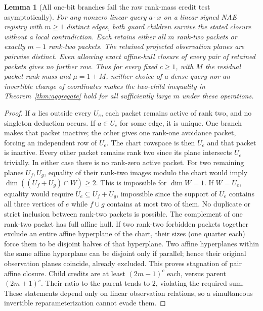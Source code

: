 \documentclass[11pt]{article}
\newtheorem{lemma}[theorem]{Lemma}
\begin{document}
\begin{lemma}[All one-bit branches fail the raw rank-mass credit test asymptotically]\label{lem:da15-one}
For any nonzero linear query $a\cdot x$ on a linear signed NAE registry with $m\ge1$ distinct edges, both guard children survive the stated closure without a local contradiction. Each retains either all $m$ rank-two packets or exactly $m-1$ rank-two packets. The retained projected observation planes are pairwise distinct. Even allowing exact affine-hull closure of every pair of retained packets gives no further row. Thus for every fixed $c\ge1$, with $M$ the residual packet rank mass and $\mu=1+M$, neither choice of a dense query nor an invertible change of coordinates makes the two-child inequality in Theorem~\ref{thm:aggregate} hold for all sufficiently large $m$ under these operations.
\end{lemma}
\begin{proof}
If $a$ lies outside every $U_e$, each packet remains active of rank two, and no singleton deduction occurs. If $a\in U_e$ for some edge, it is unique. One branch makes that packet inactive; the other gives one rank-one avoidance packet, forcing an independent row of $U_e$. The chart rowspace is then $U_e$ and that packet is inactive. Every other packet remains rank two since its plane intersects $U_e$ trivially. In either case there is no rank-zero active packet. For two remaining planes $U_f,U_g$, equality of their rank-two images modulo the chart would imply $\dim((U_f+U_g)\cap W)\ge2$. This is impossible for $\dim W=1$. If $W=U_e$, equality would require $U_e\subseteq U_f+U_g$, impossible since the support of $U_e$ contains all three vertices of $e$ while $f\cup g$ contains at most two of them. No duplicate or strict inclusion between rank-two packets is possible. The complement of one rank-two packet has full affine hull. If two rank-two forbidden packets together exclude an entire affine hyperplane of the chart, their sizes (one quarter each) force them to be disjoint halves of that hyperplane. Two affine hyperplanes within the same affine hyperplane can be disjoint only if parallel; hence their original observation planes coincide, already excluded. This proves stagnation of pair affine closure. Child credits are at least $(2m-1)^c$ each, versus parent $(2m+1)^c$. Their ratio to the parent tends to $2$, violating the required sum. These statements depend only on linear observation relations, so a simultaneous invertible reparameterization cannot evade them.
\end{proof}
\end{document}
